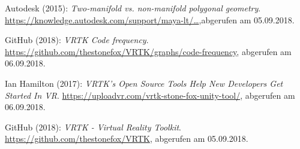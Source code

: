 \begin{thebibliography}{999}
\label{MayaDocu}
Autodesk (2015): \textit{Two-manifold vs. non-manifold polygonal geometry}.\newline
\href{https://knowledge.autodesk.com/support/maya-lt/learn-explore/caas/CloudHelp/cloudhelp/2015/ENU/MayaLT/files/Polygons-overview-Twomanifold-vs--nonmanifold-polygonal-geometry-htm.html}{https://knowledge.autodesk.com/support/maya-lt/\dots},\newline abgerufen am 05.09.2018.

\label{code-frequency}
GitHub (2018): \textit{VRTK Code frequency}.\newline
\url{https://github.com/thestonefox/VRTK/graphs/code-frequency},\newline 
abgerufen am 06.09.2018.

\label{Ian}
Ian Hamilton (2017): \textit{VRTK’s Open Source Tools Help New Developers Get Started In VR}.\newline
\url{https://uploadvr.com/vrtk-stone-fox-unity-tool/},\newline 
abgerufen am 06.09.2018.

\label{VRTK}
GitHub (2018): \textit{VRTK - Virtual Reality Toolkit}.\newline
\url{https://github.com/thestonefox/VRTK},\newline 
abgerufen am 05.09.2018.





\end{thebibliography}
